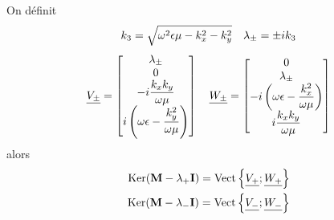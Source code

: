     \begin{prop}
        On définit
        \begin{equation}
            k_3=\sqrt{\omega^2\epsilon\mu - k_x^2 -k_y^2} \quad \lambda_\pm=\pm i k_3
        \end{equation}
        \begin{equation}
            \underline{V_\pm} = 
            \begin{bmatrix}
            \lambda_\pm \\
                0 \\
                -i\dfrac{k_xk_y}{\omega\mu} \\
                i\left(\omega\epsilon - \dfrac{k_y^2}{\omega\mu}\right) \\
            \end{bmatrix}
            \quad
            \underline{W_\pm} = 
                \begin{bmatrix}
                0 \\
                \lambda_\pm \\
                -i\left(\omega\epsilon - \dfrac{k_x^2}{\omega\mu}\right) \\
                i\dfrac{k_xk_y}{\omega\mu} \\
            \end{bmatrix}
        \end{equation}
        alors
        \begin{subequations}
            \begin{align}
                \operatorname{Ker}(\mathbf{M}-\lambda_+\mathbf{I})=\operatorname{Vect}\left\lbrace\underline{V_+};\underline{W_+}\right\rbrace\\
                \operatorname{Ker}(\mathbf{M}-\lambda_-\mathbf{I})=\operatorname{Vect}\left\lbrace\underline{V_-};\underline{W_-}\right\rbrace
            \end{align}
        \end{subequations}
    \end{prop}

